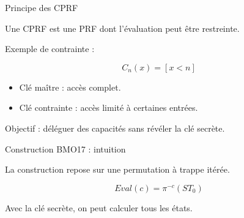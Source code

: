 \documentclass{beamer}
\begin{document}
\begin{frame}{Principe des CPRF}

Une CPRF est une PRF dont l’évaluation peut être restreinte.

\vspace{0.4cm}

Exemple de contrainte :

\[
C_n(x) = [x < n]
\]

\vspace{0.4cm}

\begin{itemize}
    \item Clé maître : accès complet.
    \item Clé contrainte : accès limité à certaines entrées.
\end{itemize}

\vspace{0.5cm}

Objectif :
déléguer des capacités sans révéler la clé secrète.
\end{frame}

\begin{frame}{Construction BMO17 : intuition}

La construction repose sur une permutation à trappe itérée.

\vspace{0.5cm}

\begin{center}
\end{center}

\vspace{0.5cm}

\[
Eval(c)=\pi^{-c}(ST_0)
\]

Avec la clé secrète, on peut calculer tous les états.
\end{frame}
\end{document}
